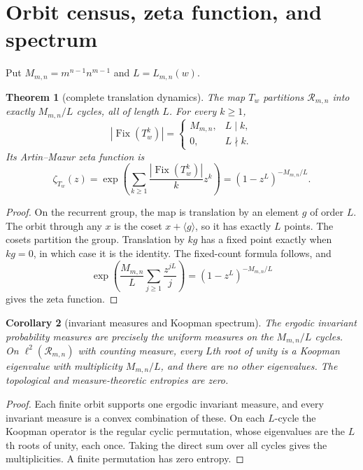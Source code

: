\documentclass[11pt,a4paper]{amsart}
\newtheorem{theorem}{Theorem}[section]
\newtheorem{corollary}[theorem]{Corollary}
\theoremstyle{definition}
\theoremstyle{remark}
\newcommand{\Rcal}{\mathcal R}
\newcommand{\Fix}{\operatorname{Fix}}
\begin{document}
\section{Orbit census, zeta function, and spectrum}

Put $M_{m,n}=m^{n-1}n^{m-1}$ and $L=L_{m,n}(w)$.

\begin{theorem}[complete translation dynamics]\label{thm:dynamics}
The map $T_w$ partitions $\Rcal_{m,n}$ into exactly
$M_{m,n}/L$ cycles, all of length $L$.  For every $k\geq1$,
\[
 |\Fix(T_w^k)|=
 \begin{cases}
 M_{m,n},&L\mid k,\\
 0,&L\nmid k.
 \end{cases}
\]
Its Artin--Mazur zeta function is
\[
 \zeta_{T_w}(z)
 =\exp\left(\sum_{k\geq1}\frac{|\Fix(T_w^k)|}{k}z^k\right)
 =(1-z^L)^{-M_{m,n}/L}.
\]
\end{theorem}

\begin{proof}
On the recurrent group, the map is translation by an element $g$ of order
$L$.  The orbit through any $x$ is the coset $x+\langle g\rangle$, so it has
exactly $L$ points.  The cosets partition the group.  Translation by $kg$ has
a fixed point exactly when $kg=0$, in which case it is the identity.  The
fixed-count formula follows, and
\[
 \exp\left(\frac{M_{m,n}}L
       \sum_{j\geq1}\frac{z^{jL}}j\right)
 =(1-z^L)^{-M_{m,n}/L}
\]
gives the zeta function.
\end{proof}

\begin{corollary}[invariant measures and Koopman spectrum]\label{cor:spectrum}
The ergodic invariant probability measures are precisely the uniform
measures on the $M_{m,n}/L$ cycles.  On
$\ell^2(\Rcal_{m,n})$ with counting measure, every $L$th root of unity is a
Koopman eigenvalue with multiplicity $M_{m,n}/L$, and there are no other
eigenvalues.  The topological and measure-theoretic entropies are zero.
\end{corollary}

\begin{proof}
Each finite orbit supports one ergodic invariant measure, and every invariant
measure is a convex combination of these.  On each $L$-cycle the Koopman
operator is the regular cyclic permutation, whose eigenvalues are the $L$th
roots of unity, each once.  Taking the direct sum over all cycles gives the
multiplicities.  A finite permutation has zero entropy.
\end{proof}
\end{document}

